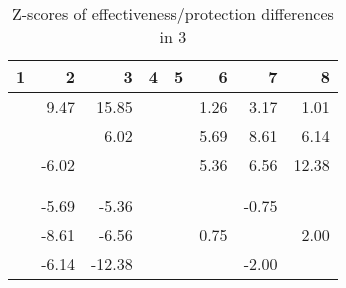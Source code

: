 \begin{table}[ht]
\centering
\begin{tabular}{rrrrrrrr}
  \hline
1 & 2 & 3 & 4 & 5 & 6 & 7 & 8 \\ 
  \hline
 & 9.47 & 15.85 &  &  & 1.26 & 3.17 & 1.01 \\ 
   &  & 6.02 &  &  & 5.69 & 8.61 & 6.14 \\ 
   & -6.02 &  &  &  & 5.36 & 6.56 & 12.38 \\ 
   &  &  &  &  &  &  &  \\ 
   &  &  &  &  &  &  &  \\ 
   & -5.69 & -5.36 &  &  &  & -0.75 &  \\ 
   & -8.61 & -6.56 &  &  & 0.75 &  & 2.00 \\ 
   & -6.14 & -12.38 &  &  &  & -2.00 &  \\ 
   \hline
\end{tabular}
\caption{Z-scores of effectiveness/protection differences in  3} 
\end{table}
